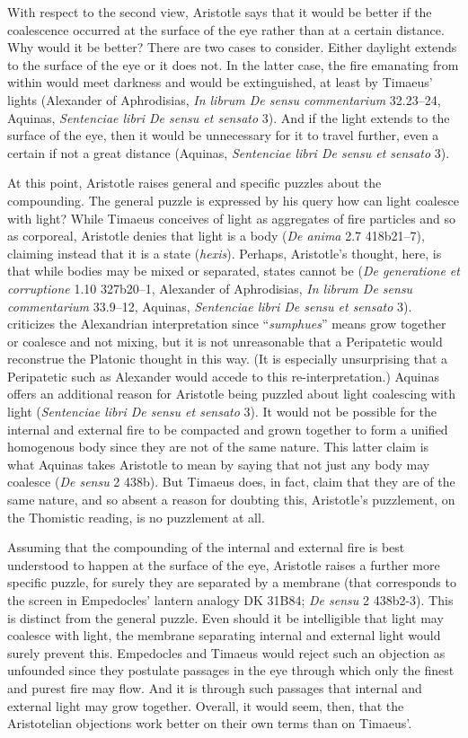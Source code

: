 With respect to the second view, Aristotle says that it would be better if the coalescence occurred at the surface of the eye rather than at a certain distance. Why would it be better? There are two cases to consider. Either daylight extends to the surface of the eye or it does not. In the latter case, the fire emanating from within would meet darkness and would be extinguished, at least by Timaeus' lights (Alexander of Aphrodisias, \emph{In librum De sensu commentarium} 32.23--24, Aquinas, \emph{Sentenciae libri De sensu et sensato} 3). And if the light extends to the surface of the eye, then it would be unnecessary for it to travel further, even a certain if not a great distance (Aquinas, \emph{Sentenciae libri De sensu et sensato} 3). 

At this point, Aristotle raises general and specific puzzles about the compounding. The general puzzle is expressed by his query how can light coalesce with light? While Timaeus conceives of light as aggregates of fire particles and so as corporeal, Aristotle denies that light is a body (\emph{De anima} 2.7 418b21--7), claiming instead that it is a state (\emph{hexis}). Perhaps, Aristotle's thought, here, is that while bodies may be mixed or separated, states cannot be (\emph{De generatione et corruptione} 1.10 327b20--1, Alexander of Aphrodisias, \emph{In librum De sensu commentarium} 33.9--12, Aquinas, \emph{Sentenciae libri De sensu et sensato} 3). \citet[140--1]{Ross:1906xi} criticizes the Alexandrian interpretation since ``\emph{sumphues}'' means grow together or coalesce and not mixing, but it is not unreasonable that a Peripatetic would reconstrue the Platonic thought in this way. (It is especially unsurprising that a Peripatetic such as Alexander would accede to this re-interpretation.) Aquinas offers an additional reason for Aristotle being puzzled about light coalescing with light (\emph{Sentenciae libri De sensu et sensato} 3). It would not be possible for the internal and external fire to be compacted and grown together to form a unified homogenous body since they are not of the same nature. This latter claim is what Aquinas takes Aristotle to mean by saying that not just any body may coalesce (\emph{De sensu} 2 438b). But Timaeus does, in fact, claim that they are of the same nature, and so absent a reason for doubting this, Aristotle's puzzlement, on the Thomistic reading, is no puzzlement at all. 

Assuming that the compounding of the internal and external fire is best understood to happen at the surface of the eye, Aristotle raises a further more specific puzzle, for surely they are separated by a membrane (that corresponds to the screen in Empedocles' lantern analogy DK 31B84; \emph{De sensu} 2 438b2-3). This is distinct from the general puzzle. Even should it be intelligible that light may coalesce with light, the membrane separating internal and external light would surely prevent this. Empedocles and Timaeus would reject such an objection as unfounded since they postulate passages in the eye through which only the finest and purest fire may flow. And it is through such passages that internal and external light may grow together. Overall, it would seem, then, that the Aristotelian objections work better on their own terms than on Timaeus'.

